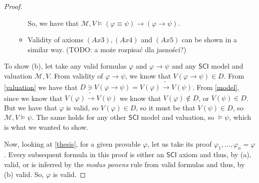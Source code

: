 \documentclass{article}
\theoremstyle{definition}
\newcommand*{\id}{\equiv}
\newcommand*{\ra}{\rightarrow}
\newcommand{\SCI}{$\mathsf{SCI}$\xspace}
\begin{document}
\begin{proof}
\begin{itemize}
\begin{itemize}
                        So, we have that $\mathcal{M}, V \models (\varphi \id \psi) \ra (\varphi \ra
                            \psi)$.

                  \item Validity of axioms $(Ax3), (Ax4)$ and $(Ax5)$ can be shown in a similar way.
                        (TODO: a może rozpisać dla jasności?)
              \end{itemize}
    \end{itemize}

    To show (b), let take any valid formulas $\varphi$ and $\varphi \ra \psi$ and
    any \SCI model and valuation $\mathcal{M}, V$. From validity of $\varphi \ra
        \psi$, we know that $V(\varphi \ra \psi) \in D$. From \cref{valuation} we have
    that $D \ni V(\varphi \ra \psi) = V(\varphi) \tilde{\ra} V(\psi)$. From
    \cref{model}, since we know that $V(\varphi) \tilde{\ra} V(\psi)$ we know that
    $V(\varphi) \not \in D$, or $V(\psi) \in D$. But we have that $\varphi$ is
    valid, so $V(\varphi) \in D$, so it must be that $V(\psi) \in D$, so
    $\mathcal{M}, V \models \psi$. The same holds for any other \SCI model and
    valuation, so $\models \psi$, which is what we wanted to show.

    Now, looking at \cref{thesis}, for a given provable $\varphi$, let us take its
    proof $\varphi_1, ..., \varphi_n = \varphi$. Every subsequent formula in this
    proof is either an \SCI axiom and thus, by (a), valid, or is inferred by the
    \emph{modus ponens} rule from valid formulas and thus, by (b) valid. So,
    $\varphi$ is valid.
\end{proof}
\end{document}
